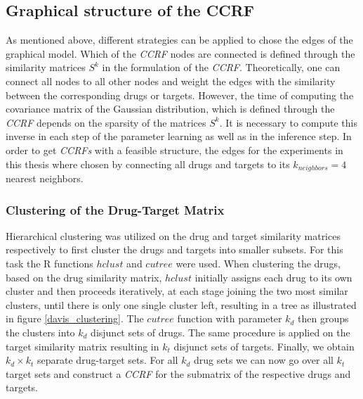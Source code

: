 \subsection{Graphical structure of the CCRF}
As mentioned above, different strategies can be applied to chose the edges of the graphical model. Which of the \textit{CCRF} nodes are connected is defined through the similarity matrices $S^k$ in the formulation of the \textit{CCRF}. Theoretically, one can connect all nodes to all other nodes and weight the edges with the similarity between the corresponding drugs or targets. However, the time of computing the covariance matrix of the Gaussian distribution, which is defined through the \textit{CCRF} depends on the sparsity of the matrices $S^k$. It is necessary to compute this inverse in each step of the parameter learning as well as in the inference step. In order to get \textit{CCRFs} with a feasible structure, the edges for the experiments in this thesis where chosen by connecting all drugs and targets to its $k_{neighbors}=4$ nearest neighbors. 


\subsubsection{Clustering of the Drug-Target Matrix}
Hierarchical clustering was utilized on the drug and target similarity matrices respectively to first cluster the drugs and targets into smaller subsets. For this task the R functions $hclust$ and $cutree$ were used. When clustering the drugs, based on the drug similarity matrix, $hclust$ initially assigns each drug to its own cluster and then proceeds iteratively, at each stage joining the two most similar clusters, until there is only one single cluster left, resulting in a tree as illustrated in figure \ref{davis_clustering}. The $cutree$ function with parameter $k_d$ then groups the clusters into $k_d$ disjunct sets of drugs. The same procedure is applied on the target similarity matrix resulting in $k_t$ disjunct sets of targets. Finally, we obtain $k_d \times k_t$ separate drug-target sets. For all $k_d$ drug sets we can now go over all $k_t$ target sets and construct a \textit{CCRF} for the submatrix of the respective drugs and targets. 

